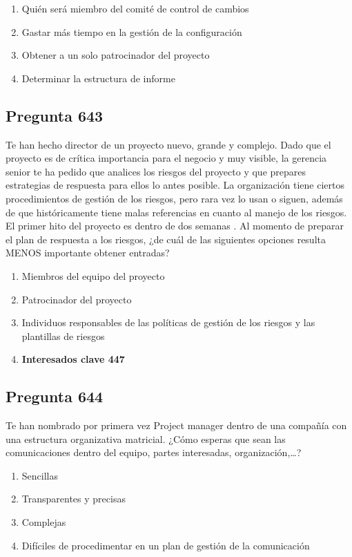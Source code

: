 \documentclass[11pt,a4paper]{article}
\begin{document}
\begin{enumerate}[label=\alph*)]
  \item Quién será miembro del comité de control de cambios
  \item Gastar más tiempo en la gestión de la configuración
  \item Obtener a un solo patrocinador del proyecto
  \item Determinar la estructura de informe
\end{enumerate}

\subsection*{Pregunta 643}
Te han hecho director de un proyecto nuevo, grande y complejo. Dado que el proyecto es de crítica importancia para el negocio y muy visible, la gerencia senior te ha pedido que analices los riesgos del proyecto y que prepares estrategias de respuesta para ellos lo antes posible. La organización tiene ciertos procedimientos de gestión de los riesgos, pero rara vez lo usan o siguen, además de que históricamente tiene malas referencias en cuanto al manejo de los riesgos. El primer hito del proyecto es dentro de dos semanas . Al momento de preparar el plan de respuesta a los riesgos, ¿de cuál de las siguientes opciones resulta MENOS importante obtener entradas?

\begin{enumerate}[label=\alph*)]
  \item Miembros del equipo del proyecto
  \item Patrocinador del proyecto
  \item Individuos responsables de las políticas de gestión de los riesgos y las plantillas de riesgos
  \item \textbf{Interesados clave 447}
\end{enumerate}

\subsection*{Pregunta 644}
Te han nombrado por primera vez Project manager dentro de una compañía con una estructura organizativa matricial. ¿Cómo esperas que sean las comunicaciones dentro del equipo, partes interesadas, organización,…?

\begin{enumerate}[label=\alph*)]
  \item Sencillas
  \item Transparentes y precisas
  \item Complejas
  \item Difíciles de procedimentar en un plan de gestión de la comunicación
\end{enumerate}
\end{document}
